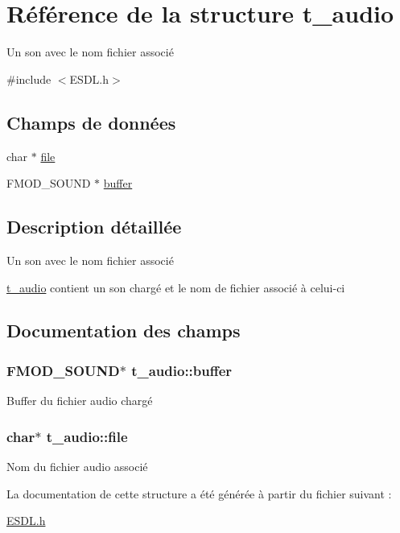 \hypertarget{structt__audio}{\section{Référence de la structure t\+\_\+audio}
\label{structt__audio}
}


Un son avec le nom fichier associé  




{\ttfamily \#include $<$E\+S\+D\+L.\+h$>$}

\subsection*{Champs de données}
\begin{DoxyCompactItemize}
\item 
char $\ast$ \hyperlink{structt__audio_a15619216bdc76a1ebf3948fb69fca637}{file}
\item 
F\+M\+O\+D\+\_\+\+S\+O\+U\+N\+D $\ast$ \hyperlink{structt__audio_aeb5464031c934ebf7f06711fe669fd44}{buffer}
\end{DoxyCompactItemize}


\subsection{Description détaillée}
Un son avec le nom fichier associé 

\hyperlink{structt__audio}{t\+\_\+audio} contient un son chargé et le nom de fichier associé à celui-\/ci 

\subsection{Documentation des champs}
\hypertarget{structt__audio_aeb5464031c934ebf7f06711fe669fd44}{
\subsubsection[{buffer}]{\setlength{\rightskip}{0pt plus 5cm}F\+M\+O\+D\+\_\+\+S\+O\+U\+N\+D$\ast$ t\+\_\+audio\+::buffer}}\label{structt__audio_aeb5464031c934ebf7f06711fe669fd44}
Buffer du fichier audio chargé \hypertarget{structt__audio_a15619216bdc76a1ebf3948fb69fca637}{
\subsubsection[{file}]{\setlength{\rightskip}{0pt plus 5cm}char$\ast$ t\+\_\+audio\+::file}}\label{structt__audio_a15619216bdc76a1ebf3948fb69fca637}
Nom du fichier audio associé 

La documentation de cette structure a été générée à partir du fichier suivant \+:\begin{DoxyCompactItemize}
\item 
\hyperlink{_e_s_d_l_8h}{E\+S\+D\+L.\+h}\end{DoxyCompactItemize}
